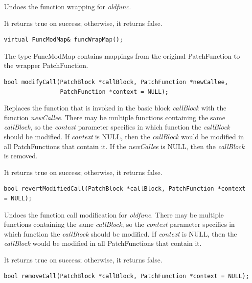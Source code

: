 \documentclass[11pt]{article}
\begin{document}
Undoes the function wrapping for \emph{oldfunc}.

It returns true on success; otherwise, it returns false.


\begin{verbatim}
virtual FuncModMap& funcWrapMap();

\end{verbatim}



The type FuncModMap contains mappings from the original PatchFunction to the
wrapper PatchFunction.


\begin{verbatim}
bool modifyCall(PatchBlock *callBlock, PatchFunction *newCallee,
                PatchFunction *context = NULL);

\end{verbatim}



Replaces the function that is invoked in the basic block \emph{callBlock} with the
function \emph{newCallee}. There may be multiple functions containing the same
\emph{callBlock}, so the \emph{context} parameter specifies in which function the
\emph{callBlock} should be modified. If \emph{context} is NULL, then the \emph{callBlock} would
be modified in all PatchFunctions that contain it. If the \emph{newCallee} is NULL,
then the \emph{callBlock} is removed.

It returns true on success; otherwise, it returns false.


\begin{verbatim}
bool revertModifiedCall(PatchBlock *callBlock, PatchFunction *context = NULL);

\end{verbatim}



Undoes the function call modification for \emph{oldfunc}. There may be multiple
functions containing the same \emph{callBlock}, so the \emph{context} parameter specifies
in which function the \emph{callBlock} should be modified. If \emph{context} is NULL, then
the \emph{callBlock} would be modified in all PatchFunctions that contain it.

It returns true on success; otherwise, it returns false.


\begin{verbatim}
bool removeCall(PatchBlock *callBlock, PatchFunction *context = NULL);

\end{verbatim}
\end{document}
